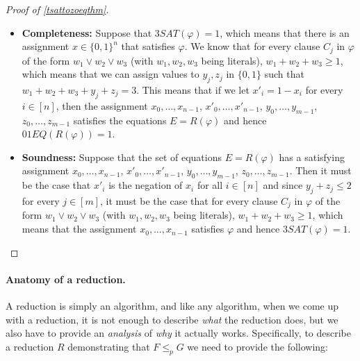 \begin{proof}[Proof of \cref{tsattozoeqthm}]
\begin{itemize}
\item
  \textbf{Completeness:} Suppose that
  \(3\ensuremath{\mathit{SAT}}(\varphi)=1\), which means that there is
  an assignment \(x\in \{0,1\}^n\) that satisfies \(\varphi\). We know
  that for every clause \(C_j\) in \(\varphi\) of the form
  \(w_1 \vee w_2 \vee w_3\) (with \(w_1,w_2,w_3\) being literals),
  \(w_1 + w_2 + w_3 \geq 1\), which means that we can assign values to
  \(y_j,z_j\) in \(\{0,1\}\) such that
  \(w_1 + w_2 + w_3 + y_j + z_j = 3\). This means that if we let
  \(x'_i = 1-x_i\) for every \(i\in [n]\), then the assignment
  \(x_0,\ldots,x_{n-1}\), \(x'_0,\ldots,x'_{n-1}\),
  \(y_0,\ldots,y_{m-1}\), \(z_0,\ldots,z_{m-1}\) satisfies the equations
  \(E = R(\varphi)\) and hence
  \(01\ensuremath{\mathit{EQ}}(R(\varphi))=1\).
\item
  \textbf{Soundness:} Suppose that the set of equations \(E=R(\varphi)\)
  has a satisfying assignment \(x_0,\ldots,x_{n-1}\),
  \(x'_0,\ldots,x'_{n-1}\), \(y_0,\ldots,y_{m-1}\),
  \(z_0,\ldots,z_{m-1}\). Then it must be the case that \(x'_i\) is the
  negation of \(x_i\) for all \(i\in [n]\) and since
  \(y_j + z_j \leq 2\) for every \(j\in [m]\), it must be the case that
  for every clause \(C_j\) in \(\varphi\) of the form
  \(w_1 \vee w_2 \vee w_3\) (with \(w_1,w_2,w_3\) being literals),
  \(w_1 + w_2 + w_3 \geq 1\), which means that the assignment
  \(x_0,\ldots,x_{n-1}\) satisfies \(\varphi\) and hence
  \(3\ensuremath{\mathit{SAT}}(\varphi)=1\).
\end{itemize}

\end{proof}

\paragraph{Anatomy of a reduction.} A reduction is simply an algorithm,
and like any algorithm, when we come up with a reduction, it is not
enough to describe \emph{what} the reduction does, but we also have to
provide an \emph{analysis} of \emph{why} it actually works.
Specifically, to describe a reduction \(R\) demonstrating that
\(F \leq_p G\) we need to provide the following:


